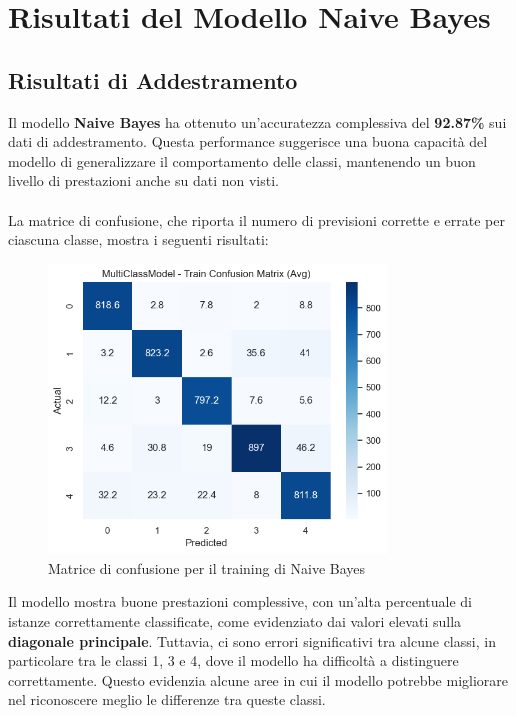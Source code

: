 \newpage

\section{Risultati del Modello Naive Bayes}

\subsection{Risultati di Addestramento}

Il modello \textbf{Naive Bayes} ha ottenuto un'accuratezza complessiva del \textbf{92.87\%} sui dati di addestramento. Questa performance suggerisce una buona capacità del modello di generalizzare il comportamento delle classi, mantenendo un buon livello di prestazioni anche su dati non visti. \\ \\
La matrice di confusione, che riporta il numero di previsioni corrette e errate per ciascuna classe, mostra i seguenti risultati:

\begin{figure}[H]
    \centering
    \includegraphics[width=0.8\textwidth]{images/confusion_matrix_train_naive_bayes.png}
    \caption{Matrice di confusione per il training di Naive Bayes}
    \label{fig:confusion_matrix_train_naive_bayes}
\end{figure}

Il modello mostra buone prestazioni complessive, con un'alta percentuale di istanze correttamente classificate, come evidenziato dai valori elevati sulla \textbf{diagonale principale}. Tuttavia, ci sono errori significativi tra alcune classi, in particolare tra le classi 1, 3 e 4, dove il modello ha difficoltà a distinguere correttamente. Questo evidenzia alcune aree in cui il modello potrebbe migliorare nel riconoscere meglio le differenze tra queste classi.

